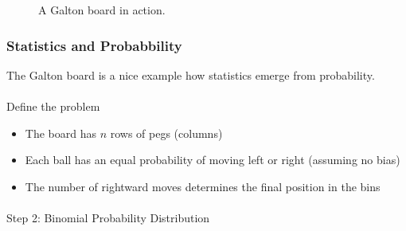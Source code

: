 \documentclass[
  a4paper,
]{scrbook}
\makeatletter
\let\oldparagraph\paragraph
\renewcommand{\paragraph}{
    \@ifstar
      \xxxParagraphStar
      \xxxParagraphNoStar
  }
\newcommand{\xxxParagraphStar}[1]{\oldparagraph*{#1}\mbox{}}
\newcommand{\xxxParagraphNoStar}[1]{\oldparagraph{#1}\mbox{}}
\providecommand{\tightlist}{%
  \setlength{\itemsep}{0pt}\setlength{\parskip}{0pt}}\usepackage{longtable,booktabs,array}
\makeatother
\begin{document}
\begin{figure}[ht]


\caption{\label{fig-plinko}A Galton board in action.}

\end{figure}%

\subsubsection{Statistics and
Probabbility}\label{statistics-and-probabbility}

The Galton board is a nice example how statistics emerge from
probability.

\paragraph{Define the problem}\label{define-the-problem}

\begin{itemize}
\tightlist
\item
  The board has \(n\) rows of pegs (columns)
\item
  Each ball has an equal probability of moving left or right (assuming
  no bias)
\item
  The number of rightward moves determines the final position in the
  bins
\end{itemize}

\paragraph{Step 2: Binomial Probability
Distribution}\label{step-2-binomial-probability-distribution}
\end{document}

